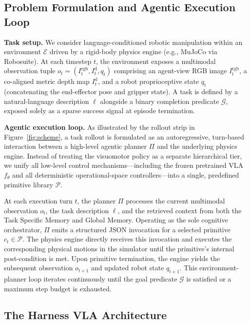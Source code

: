\documentclass[11pt]{article}
\begin{document}
	\subsection{Problem Formulation and Agentic Execution Loop}
	\label{sec:method:formulation}

	\textbf{Task setup.} We consider language-conditioned robotic manipulation within an environment $\mathcal{E}$ driven by a rigid-body physics engine (e.g., MuJoCo via Robosuite). At each timestep $t$, the environment exposes a multimodal observation tuple $o_t = (I_t^{\text{rgb}}, I_t^{\text{d}}, q_t)$ comprising an agent-view RGB image $I_t^{\text{rgb}}$, a co-aligned metric depth map $I_t^{\text{d}}$, and a robot proprioceptive state $q_t$ (concatenating the end-effector pose and gripper state). A task is defined by a natural-language description $\ell$ alongside a binary completion predicate $\mathcal{G}$, exposed solely as a sparse success signal at episode termination.

	\textbf{Agentic execution loop.} As illustrated by the rollout strip in Figure~\ref{fig:scheme}, a task rollout is formulated as an autoregressive, turn-based interaction between a high-level agentic planner $\Pi$ and the underlying physics engine. Instead of treating the visuomotor policy as a separate hierarchical tier, we unify all low-level control mechanisms---including the frozen pretrained VLA $f_\theta$ and all deterministic operational-space controllers---into a single, predefined primitive library $\mathcal{P}$.

	At each execution turn $t$, the planner $\Pi$ processes the current multimodal observation $o_t$, the task description $\ell$, and the retrieved context from both the Task Specific Memory and Global Memory. Operating as the sole cognitive orchestrator, $\Pi$ emits a structured JSON invocation for a selected primitive $c_t \in \mathcal{P}$. The physics engine directly receives this invocation and executes the corresponding physical motions in the simulator until the primitive's internal post-condition is met. Upon primitive termination, the engine yields the subsequent observation $o_{t+1}$ and updated robot state $q_{t+1}$. This environment-planner loop iterates continuously until the goal predicate $\mathcal{G}$ is satisfied or a maximum step budget is exhausted.

	\subsection{The Harness VLA Architecture}
	\label{sec:method:harness}
\end{document}
